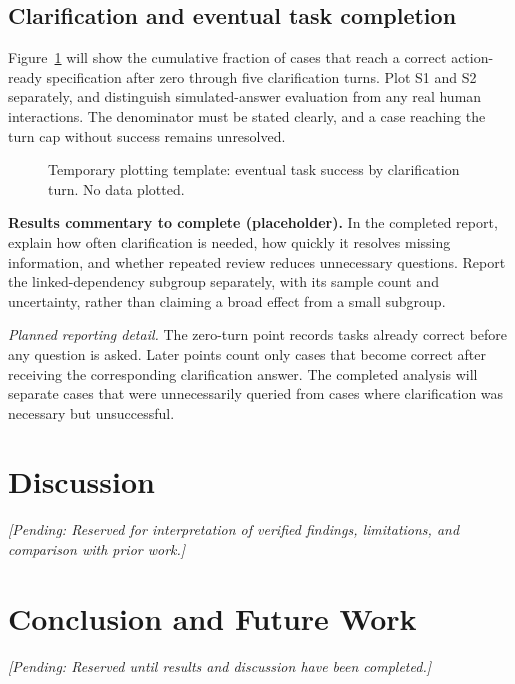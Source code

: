 \documentclass[10pt,conference]{IEEEtran}
\newcommand{\pending}[1]{\noindent\textit{[Pending: #1]}\par}
\begin{document}
\subsection{Clarification and eventual task completion}
Figure~\ref{fig:clarification} will show the cumulative fraction of cases that reach a correct action-ready specification after zero through five clarification turns. Plot S1 and S2 separately, and distinguish simulated-answer evaluation from any real human interactions. The denominator must be stated clearly, and a case reaching the turn cap without success remains unresolved.
\begin{figure}[!tbp]
\centering
{}
\caption{Temporary plotting template: eventual task success by clarification turn. No data plotted.}
\label{fig:clarification}
\end{figure}
\noindent\textbf{Results commentary to complete (placeholder).}  In the completed report, explain how often clarification is needed, how quickly it resolves missing information, and whether repeated review reduces unnecessary questions. Report the linked-dependency subgroup separately, with its sample count and uncertainty, rather than claiming a broad effect from a small subgroup.

\noindent\textit{Planned reporting detail.} The zero-turn point records tasks already correct before any question is asked. Later points count only cases that become correct after receiving the corresponding clarification answer. The completed analysis will separate cases that were unnecessarily queried from cases where clarification was necessary but unsuccessful.

\FloatBarrier
\section{Discussion}
\pending{Reserved for interpretation of verified findings, limitations, and comparison with prior work.}
\section{Conclusion and Future Work}
\pending{Reserved until results and discussion have been completed.}
\end{document}
